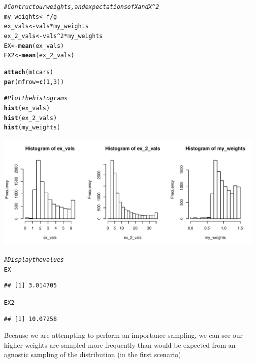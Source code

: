 \documentclass{article}\usepackage[]{graphicx}\usepackage[]{color}
\makeatletter
\def\maxwidth{ %
  \ifdim\Gin@nat@width>\linewidth
    \linewidth
  \else
    \Gin@nat@width
  \fi
}
\newcommand{\hlnum}[1]{\textcolor[rgb]{0.686,0.059,0.569}{#1}}%
\newcommand{\hlcom}[1]{\textcolor[rgb]{0.678,0.584,0.686}{\textit{#1}}}%
\newcommand{\hlopt}[1]{\textcolor[rgb]{0,0,0}{#1}}%
\newcommand{\hlstd}[1]{\textcolor[rgb]{0.345,0.345,0.345}{#1}}%
\newcommand{\hlkwb}[1]{\textcolor[rgb]{0.69,0.353,0.396}{#1}}%
\newcommand{\hlkwc}[1]{\textcolor[rgb]{0.333,0.667,0.333}{#1}}%
\newcommand{\hlkwd}[1]{\textcolor[rgb]{0.737,0.353,0.396}{\textbf{#1}}}%
\newenvironment{kframe}{%
 \def\at@end@of@kframe{}%
 \ifinner\ifhmode%
  \def\at@end@of@kframe{\end{minipage}}%
  \begin{minipage}{\columnwidth}%
 \fi\fi%
 \def\FrameCommand##1{\hskip\@totalleftmargin \hskip-\fboxsep
 \colorbox{shadecolor}{##1}\hskip-\fboxsep
     \hskip-\linewidth \hskip-\@totalleftmargin \hskip\columnwidth}%
 \MakeFramed {\advance\hsize-\width
   \@totalleftmargin\z@ \linewidth\hsize
   \@setminipage}}%
 {\par\unskip\endMakeFramed%
 \at@end@of@kframe}
\newenvironment{knitrout}{}{} %
\makeatother
\begin{document}
\begin{knitrout}
\begin{kframe}
\begin{alltt}
\hlcom{# Contruct our weights, and expectations of X and X^2}
\hlstd{my_weights} \hlkwb{<-} \hlstd{f} \hlopt{/} \hlstd{g}
\hlstd{ex_vals} \hlkwb{<-} \hlstd{vals} \hlopt{*} \hlstd{my_weights}
\hlstd{ex_2_vals} \hlkwb{<-} \hlstd{vals}\hlopt{^}\hlnum{2} \hlopt{*} \hlstd{my_weights}
\hlstd{EX} \hlkwb{<-} \hlkwd{mean}\hlstd{(ex_vals)}
\hlstd{EX2} \hlkwb{<-} \hlkwd{mean}\hlstd{(ex_2_vals)}

\hlkwd{attach}\hlstd{(mtcars)}
\hlkwd{par}\hlstd{(}\hlkwc{mfrow}\hlstd{=}\hlkwd{c}\hlstd{(}\hlnum{1}\hlstd{,}\hlnum{3}\hlstd{))}

\hlcom{# Plot the histograms}
\hlkwd{hist}\hlstd{(ex_vals)}
\hlkwd{hist}\hlstd{(ex_2_vals)}
\hlkwd{hist}\hlstd{(my_weights)}
\end{alltt}
\end{kframe}
\includegraphics[width=\maxwidth]{figure/unnamed-chunk-2-1} 
\begin{kframe}\begin{alltt}
\hlcom{# Display the values}
\hlstd{EX}
\end{alltt}
\begin{verbatim}
## [1] 3.014705
\end{verbatim}
\begin{alltt}
\hlstd{EX2}
\end{alltt}
\begin{verbatim}
## [1] 10.07258
\end{verbatim}
\end{kframe}
\end{knitrout}

Because we are attempting to perform an importance sampling, we can see our higher weights are sampled more frequently than would be expected from an agnostic sampling of the distribution (in the first scenario).

\subsection{}
\end{document}
